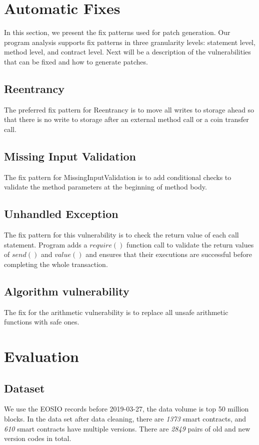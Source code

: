 \documentclass[a4paper, 10pt, conference, twocolumn]{ieeeconf}       %
\begin{document}
\section{Automatic Fixes}

In this section, we present the fix patterns used for patch generation.
Our program analysis supports fix patterns in three granularity levels: statement level, method level, and contract level.
Next will be a description of the vulnerabilities that can be fixed and how to generate patches.

\subsection{Reentrancy}

The preferred fix pattern for Reentrancy is to move all writes to storage ahead so that there is no write to storage after an external method call or a coin transfer call.

\subsection{Missing Input Validation}

The fix pattern for MissingInputValidation is to add conditional checks to validate the method parameters at the beginning of method body.

\subsection{Unhandled Exception}

The fix pattern for this vulnerability is to check the return value of each call statement.
Program adds a $require()$ function call to validate the return values of $send()$ and $value()$ and ensures that their executions are successful before completing the whole transaction.

\subsection{Algorithm vulnerability}

The fix for the arithmetic vulnerability is to replace all unsafe arithmetic functions with safe ones.

\section{Evaluation}

\subsection{Dataset}
We use the EOSIO records before 2019-03-27,
the data volume is top 50 million blocks.
In the data set after data cleaning,
there are \emph{1373} smart contracts,
and \emph{610} smart contracts have multiple versions.
There are \emph{2849} pairs of old and new version codes in total.
\end{document}
